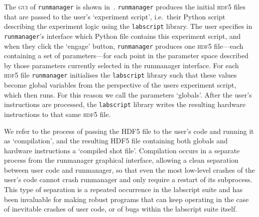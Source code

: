 The \textsc{gui} of \texttt{runmanager} is shown in~. \texttt{runmanager} produces the initial \textsc{hdf5} files that are passed to the user's `experiment script', i.e.~their Python script describing the experiment logic using the \texttt{labscript} library. The user specifies in \texttt{runmanager}'s interface which Python file contains this experiment script, and when they click the `engage' button, \texttt{runmanager} produces one \textsc{hdf5} file---each containing a set of parameters---for each point in the parameter space described by those parameters currently selected in the runmanager interface. For each \textsc{hdf5} file \texttt{runmanager} initialises the \texttt{labscript} library such that these values become global variables from the perspective of the users experiment script, which then runs. For this reason we call the parameters `globals'. After the user's instructions are processed, the \texttt{labscript} library writes the resulting hardware instructions to that same \textsc{hdf5} file.

We refer to the process of passing the HDF5 file to the user's code and running it as `compilation', and the resulting HDF5 file containing both globals and hardware instructions a `compiled shot file'. Compilation occurs in a separate process from the runmanager graphical interface, allowing a clean separation between user code and runmanager, so that even the most low-level crashes of the user's code cannot crash runmanager and only require a restart of its subprocess. This type of separation is a repeated occurrence in the labscript suite and has been invaluable for making robust programs that can keep operating in the case of inevitable crashes of user code, or of bugs within the labscript suite itself.

